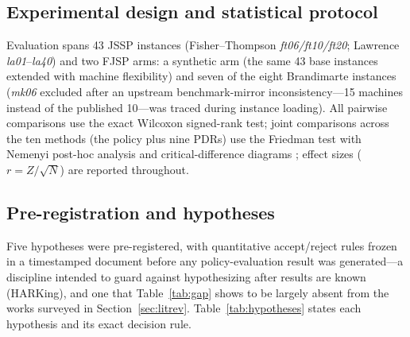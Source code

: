 \documentclass[11pt]{article}
\begin{document}
\subsection{Experimental design and statistical protocol}

Evaluation spans 43 JSSP instances (Fisher--Thompson \emph{ft06/ft10/ft20}; Lawrence \emph{la01}--\emph{la40}) and two FJSP arms: a synthetic arm (the same 43 base instances extended with machine flexibility) and seven of the eight Brandimarte instances (\emph{mk06} excluded after an upstream benchmark-mirror inconsistency---15 machines instead of the published 10---was traced during instance loading). All pairwise comparisons use the exact Wilcoxon signed-rank test; joint comparisons across the ten methods (the policy plus nine PDRs) use the Friedman test with Nemenyi post-hoc analysis and critical-difference diagrams \citep{demsar2006}; effect sizes ($r = Z/\sqrt{N}$) are reported throughout.

\subsection{Pre-registration and hypotheses}
\label{sec:prereg}

Five hypotheses were pre-registered, with quantitative accept/reject rules frozen in a timestamped document before any policy-evaluation result was generated---a discipline intended to guard against hypothesizing after results are known (HARKing), and one that Table~\ref{tab:gap} shows to be largely absent from the works surveyed in Section~\ref{sec:litrev}. Table~\ref{tab:hypotheses} states each hypothesis and its exact decision rule.
\end{document}
